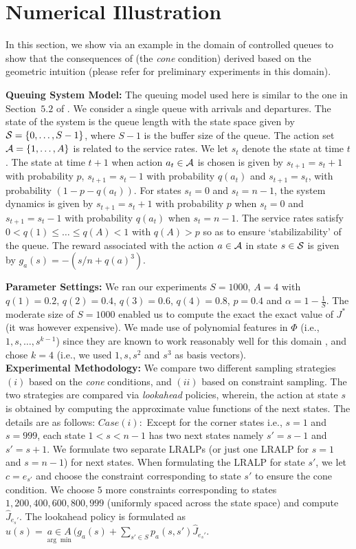 \section{Numerical Illustration}
In this section, we show via an example in the domain of controlled queues to show that the consequences of  (the \emph{cone} condition) derived based on the geometric intuition (please refer \cite{aaaipaper} for preliminary experiments in this domain).

\textbf{Queuing System Model:} The queuing model used here is similar to the one in Section~$5.2$ of \cite{ALP}. We consider a single queue with arrivals and departures. The state of the system is the queue length with the state space given by $\S=\{0,\ldots,S-1\}$, where $S-1$ is the buffer size of the queue. The action set $\A=\{1,\ldots,A\}$ is related to the service rates. We let $s_t$ denote the state at time $t$. The state at time $t+1$ when action $a_t \in \A $ is chosen is given by $s_{t+1}= s_{t}+1$ with probability $p$, $s_{t+1}= s_{t}-1$ with probability $q(a_t)$ and $s_{t+1}= s_t$, with probability $(1-p-q(a_t))$. For states $s_t=0$ and $s_t=n-1$, the system dynamics is given by $s_{t+1}= s_{t}+1$ with probability $p$ when $s_t=0$ and $s_{t+1}=s_t-1$ with probability $q(a_t)$ when $s_t=n-1$. The service rates satisfy $0<q(1)\leq \ldots\leq q(A)<1$ with $q(A)>p$ so as to ensure `stabilizability' of the queue. The reward associated with the action $a \in \A$ in state $s\in \S$ is given by $g_a(s)=-(s/n+q(a)^3)$.\par
\textbf{Parameter Settings:} We ran our experiments $S=1000$, $A=4$ with $q(1)=0.2$, $q(2)=0.4$, $q(3)=0.6$, $q(4)=0.8$, $p=0.4$ and $\alpha=1-\frac{1}{S}$.
The moderate size of $S=1000$ enabled us to compute the exact the exact value of $J^*$ (it was however expensive). We made use of polynomial features in $\Phi$ (i.e., $1,s,\ldots,s^{k-1}$) since they are known to work reasonably well for this domain \cite{ALP}, and chose $k=4$ (i.e., we used $1, s,s^2$ and $s^3$ as basis vectors).\\
\textbf{Experimental Methodology:} We compare two different sampling strategies $(i)$ based on the \emph{cone} conditions, and $(ii)$ based on constraint sampling. The two strategies are compared via  \emph{lookahead} policies, wherein, the action at state $s$ is obtained by computing the approximate value functions of the next states. The details are as follows:
$Case (i):$ Except for the corner states i.e., $s=1$ and $s=999$, each state $1<s<n-1$ has two next states namely $s'=s-1$ and $s'=s+1$. We formulate two separate LRALPs (or just one LRALP for $s=1$ and $s=n-1$) for next states. When formulating the LRALP for state $s'$, we let $c=e_{s'}$ and choose the constraint corresponding to state $s'$ to ensure the cone condition. We choose $5$ more constraints corresponding to states $1,200,400,600,800,999$ (uniformly spaced across the state space) and compute $\hat{J}_{e_s'}$. The lookahead policy is formulated as $u(s)=\underset{\arg\min}{a\in A}(g_a(s)+\underset{s'\in S}{\sum}p_a(s,s')\hat{J}_{e_s'}$.\\
